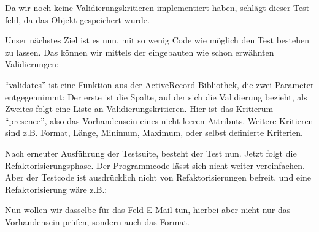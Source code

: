 Da wir noch keine Validierungskritieren implementiert haben, schlägt dieser Test fehl, da das Objekt gespeichert wurde.

Unser nächstes Ziel ist es nun, mit so wenig Code wie möglich den Test bestehen zu lassen. Das können wir mittels der eingebauten wie schon erwähnten Validierungen:

\begin{ruby}[label=app/models/job.rb]
   
      
\end{ruby}
"`validates"' ist eine Funktion aus der ActiveRecord Bibliothek, die zwei Parameter entgegennimmt: Der erste ist die Spalte, auf der sich die Validierung bezieht, als Zweites folgt eine Liste an Validierungskritieren. Hier ist das Kritierum "`presence"', also das Vorhandensein eines nicht-leeren Attributs. Weitere Kritieren sind z.B. Format, Länge, Minimum, Maximum, oder selbst definierte Kriterien.

\tddgreen
Nach erneuter Ausführung der Testsuite, besteht der Test nun. Jetzt folgt die Refaktorisierungsphase. Der Programmcode lässt sich nicht weiter vereinfachen. Aber der Testcode ist ausdrücklich nicht von Refaktorisierungen befreit, und eine Refaktorisierung wäre z.B.:
\tddrefactor
\begin{ruby}[label=test/unit/job\_test.rb]
  
       
   
\end{ruby}

Nun wollen wir dasselbe für das Feld E-Mail tun, hierbei aber nicht nur das Vorhandensein prüfen, sondern auch das Format.

